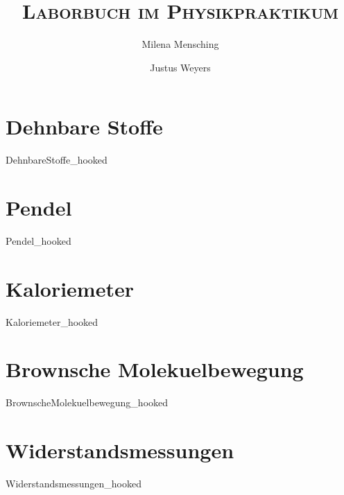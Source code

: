 

\title{\textsc{Laborbuch im Physikpraktikum}}
\author{Milena Mensching \and Justus Weyers}


	\maketitle
	\newpage	
    \tableofcontents
    \newpage
    
    \part{Dehnbare Stoffe}
	{DehnbareStoffe_hooked}
	
	\part{Pendel}
	{Pendel_hooked}

	\part{Kaloriemeter}
	{Kaloriemeter_hooked}
	
	\part{Brownsche Molekuelbewegung}
	{BrownscheMolekuelbewegung_hooked}
	
	\part{Widerstandsmessungen}
	{Widerstandsmessungen_hooked}
	
	\newpage
    
    
	\newpage
	\listoffigures
	\listoftables

